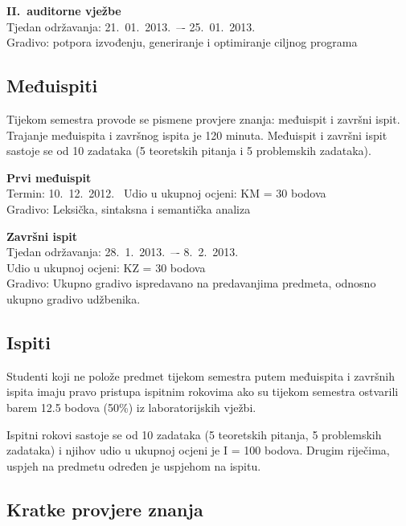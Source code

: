\documentclass[times, 12pt, utf8]{book}
\begin{document}
\textbf{II.~auditorne vježbe} \\
Tjedan održavanja: 21.~01.~2013.~–- 25.~01.~2013. \\
Gradivo: potpora izvođenju, generiranje i optimiranje ciljnog programa


\cleardoublepage  
{}  
{}
\subsection*{Međuispiti}

Tijekom semestra provode se pismene provjere znanja: međuispit i završni ispit.
Trajanje međuispita i završnog ispita je 120 minuta.
Međuispit i završni ispit sastoje se od 10 zadataka (5 teoretskih pitanja i 5 problemskih zadataka).

\textbf{Prvi međuispit} \\
Termin: 10.~12.~2012.~
Udio u ukupnoj ocjeni:  KM = 30 bodova \\
Gradivo: Leksička, sintaksna i semantička analiza

\textbf{Završni ispit} \\
Tjedan održavanja: 28.~1.~2013.~–- 8.~2.~2013. \\
Udio u ukupnoj ocjeni: KZ = 30 bodova \\
Gradivo: Ukupno gradivo ispredavano na predavanjima predmeta, odnosno ukupno gradivo udžbenika.

\cleardoublepage  
{}  
{}
\subsection*{Ispiti}

Studenti koji ne polože predmet tijekom semestra putem međuispita i završnih ispita imaju pravo pristupa ispitnim rokovima ako su tijekom semestra ostvarili barem 12.5 bodova (50\%) iz laboratorijskih vježbi.

Ispitni rokovi sastoje se od 10 zadataka (5 teoretskih pitanja, 5 problemskih zadataka) i njihov udio u ukupnoj ocjeni je I = 100 bodova.
Drugim riječima, uspjeh na predmetu određen je uspjehom na ispitu.

\cleardoublepage  
{}  
{}
\subsection*{Kratke provjere znanja}
\end{document}
